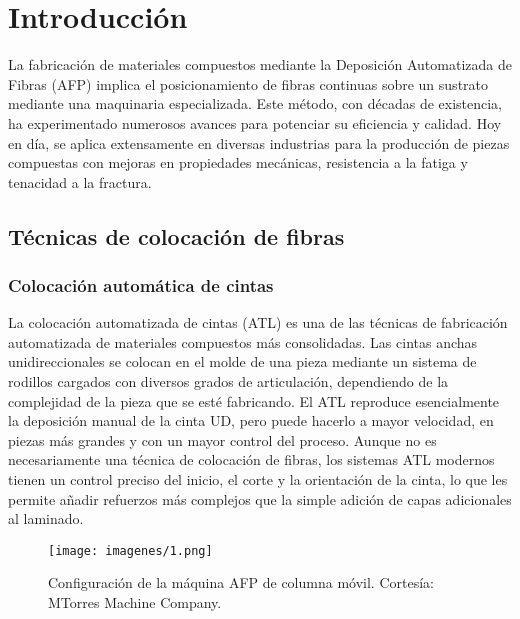 \chapter{Introducción}
\label{introduccion}
La fabricación de materiales compuestos mediante la Deposición Automatizada de Fibras (AFP) implica el posicionamiento de fibras continuas sobre un sustrato mediante una maquinaria especializada. Este método, con décadas de existencia, ha experimentado numerosos avances para potenciar su eficiencia y calidad. Hoy en día, se aplica extensamente en diversas industrias para la producción de piezas compuestas con mejoras en propiedades mecánicas, resistencia a la fatiga y tenacidad a la fractura.

\section{Técnicas de colocación de fibras}
\subsection{Colocación automática de cintas}
La colocación automatizada de cintas (ATL) es una de las técnicas de fabricación automatizada de materiales compuestos más consolidadas. Las cintas anchas unidireccionales se colocan en el molde de una pieza mediante un sistema de rodillos cargados con diversos grados de articulación, dependiendo de la complejidad de la pieza que se esté fabricando. El ATL reproduce esencialmente la deposición manual de la cinta UD, pero puede hacerlo a mayor velocidad, en piezas más grandes y con un mayor control del proceso. Aunque no es necesariamente una técnica de colocación de fibras, los sistemas ATL modernos tienen un control preciso del inicio, el corte y la orientación de la cinta, lo que les permite añadir refuerzos más complejos que la simple adición de capas adicionales al laminado.

 \begin{figure}[h]
    \centering
    \texttt{[image: imagenes/1.png]}
    \caption{Configuración de la máquina AFP de columna móvil. Cortesía: MTorres Machine Company.}
    \label{fig:enter-label}
\end{figure}

